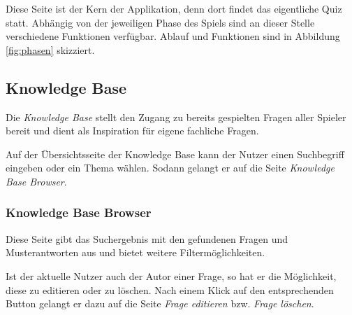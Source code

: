 \documentclass[a4paper,11pt,listof=numbered,glossary=totoc,parskip=half,toc=bib]{scrreprt}
\begin{document}
	Diese Seite ist der Kern der Applikation, denn dort findet das eigentliche Quiz statt. Abhängig von der jeweiligen Phase des Spiels sind an dieser Stelle verschiedene Funktionen verfügbar. Ablauf und Funktionen sind in Abbildung \ref{fig:phasen} skizziert.
	
	
	\subsection{Knowledge Base}
	Die \textit{Knowledge Base} stellt den Zugang zu bereits gespielten Fragen aller Spieler bereit und dient als Inspiration für eigene fachliche Fragen.
	
	Auf der Übersichtsseite der Knowledge Base kann der Nutzer einen Suchbegriff eingeben oder ein Thema wählen. Sodann gelangt er auf die Seite \textit{Knowledge Base Browser}.
	
	\subsubsection{Knowledge Base Browser}
	Diese Seite gibt das Suchergebnis mit den gefundenen Fragen und Musterantworten aus und bietet weitere Filtermöglichkeiten.
	
	Ist der aktuelle Nutzer auch der Autor einer Frage, so hat er die Möglichkeit, diese zu editieren oder zu löschen. Nach einem Klick auf den entsprechenden Button gelangt er dazu auf die Seite \textit{Frage editieren} bzw. \textit{Frage löschen}.

	\setcounter{chapter}{0}
	
	
	
\end{document}
